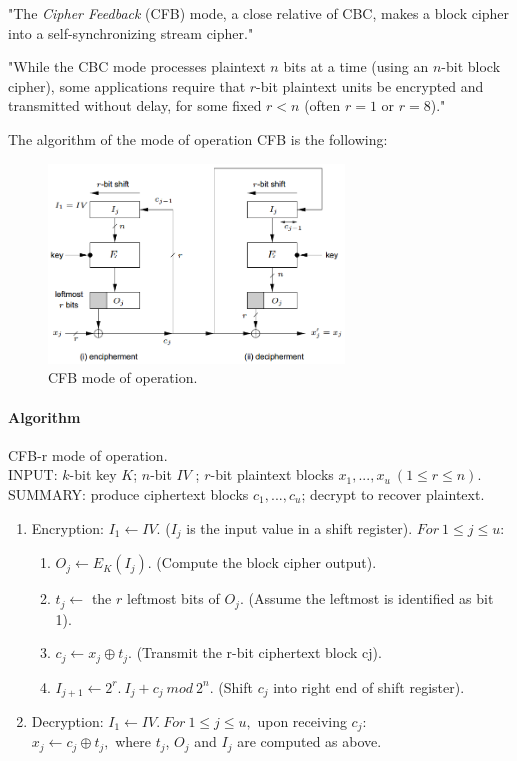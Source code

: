 \documentclass[a4paper,12pt,titlepage]{article}
\begin{document}
"The \textit{Cipher Feedback} (CFB) mode, a close relative of CBC, makes a block cipher into a self-synchronizing stream cipher." \citep{wiki:mode-operation}

"While the CBC mode processes plaintext $n$ bits at a time (using an $n$-bit block cipher), some applications require that $r$-bit plaintext units be encrypted and transmitted without delay, for some fixed $r < n$ (often $r = 1$ or $r = 8$)." \citep{menezes_handbook_1996}

The algorithm of the mode of operation CFB is the following:

\begin{figure}[!ht]
	\centering
	\label{fig:cfb}
	\includegraphics[width=0.7\textwidth]{cfb.png}
	\caption{CFB mode of operation. \citep{menezes_handbook_1996}}
\end{figure}

\paragraph{Algorithm}
CFB-r mode of operation. \citep{menezes_handbook_1996} \\
INPUT: $k$-bit key $K$; $n$-bit $IV$ ; $r$-bit plaintext blocks $x_1, ... , x_u\ (1 \le r \le n)$. \\
SUMMARY: produce ciphertext blocks $c_1, ... , c_u$; decrypt to recover plaintext.
\begin{enumerate}[noitemsep]
\item Encryption: $I_1 \leftarrow IV.$ ($I_j$ is the input value in a shift register). $For\ 1 \le j \le u:$
	\begin{enumerate}
	\item $O_j \leftarrow E_K(I_j).$ (Compute the block cipher output).
	\item $t_j \leftarrow$ the $r$ leftmost bits of $O_j$. (Assume the leftmost is identified as bit 1).
	\item $c_j \leftarrow x_j \oplus t_j.$ (Transmit the r-bit ciphertext block cj).
	\item $I_{j+1} \leftarrow 2^r.\ I_j + c_j\ mod\ 2^n.$ (Shift $c_j$ into right end of shift register).
	\end{enumerate}
\item Decryption: $I_1 \leftarrow IV.\ For\ 1 \le j \le u,$ upon receiving $c_j$:\\
$x_j \leftarrow c_j \oplus t_j,$ where $t_j$, $O_j$ and $I_j$ are computed as above.
\end{enumerate}
\end{document}
